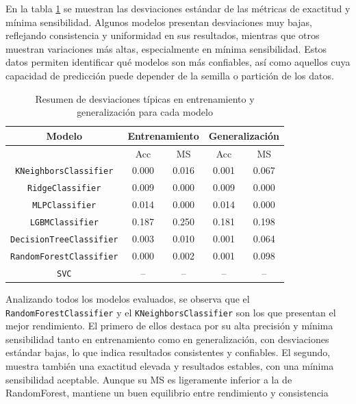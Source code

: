 \newpage
En la tabla \ref{tabla:resumen_std_multi} se muestran las desviaciones estándar de las métricas de exactitud y mínima sensibilidad. Algunos modelos presentan desviaciones muy bajas, reflejando consistencia y uniformidad en sus resultados, mientras que otros muestran variaciones más altas, especialmente en mínima sensibilidad. Estos datos permiten identificar qué modelos son más confiables, así como aquellos cuya capacidad de predicción puede depender de la semilla o partición de los datos.

\begin{table}[H]
	\centering
	\begin{tabular}{|c|c|c|c|c|}
		\hline
		\rowcolor{LightCyan}
		Modelo & \multicolumn{2}{c|}{Entrenamiento} & \multicolumn{2}{c|}{Generalización} \\
		\hline
		\rowcolor{LightCyan}
		& Acc & MS & Acc & MS \\
		\hline
		\texttt{KNeighborsClassifier}   & 0.000 & 0.016 & 0.001 & 0.067 \\
		\texttt{RidgeClassifier}        & 0.009 & 0.000 & 0.009 & 0.000 \\
		\texttt{MLPClassifier}          & 0.014 & 0.000 & 0.014 & 0.000 \\
		\texttt{LGBMClassifier}         & 0.187 & 0.250 & 0.181 & 0.198 \\
		\texttt{DecisionTreeClassifier} & 0.003 & 0.010 & 0.001 & 0.064 \\
		\texttt{RandomForestClassifier} & 0.000 & 0.002 & 0.001 & 0.098 \\
		\texttt{SVC}                    & --    & --    & --    & --    \\
		\hline
	\end{tabular}
	\caption{Resumen de desviaciones típicas en entrenamiento y generalización para cada modelo}
	\label{tabla:resumen_std_multi}
\end{table}

Analizando todos los modelos evaluados, se observa que el \texttt{RandomForestClassifier} y el \texttt{KNeighborsClassifier} son los que presentan el mejor rendimiento. El primero de ellos destaca por su alta precisión y mínima sensibilidad tanto en entrenamiento como en generalización, con desviaciones estándar bajas, lo que indica resultados consistentes y confiables. El segundo, muestra también una exactitud elevada y resultados estables, con una mínima sensibilidad aceptable. Aunque su MS es ligeramente inferior a la de RandomForest, mantiene un buen equilibrio entre rendimiento y consistencia

